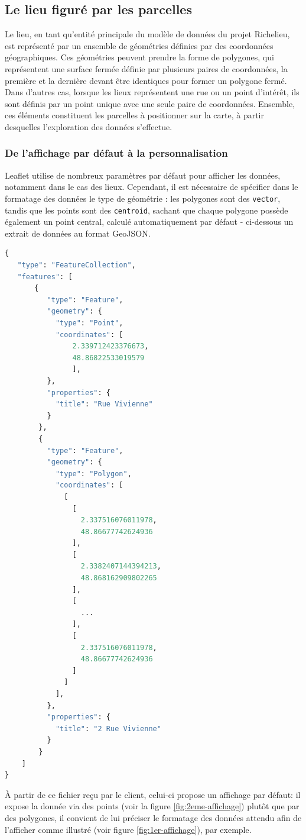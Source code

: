 \subsection{Le lieu figuré par les parcelles}
Le lieu, en tant qu'entité principale du modèle de données du projet Richelieu, est représenté par un ensemble de géométries définies par des coordonnées géographiques. Ces géométries peuvent prendre la forme de polygones, qui représentent une surface fermée définie par plusieurs paires de coordonnées, la première et la dernière devant être identiques pour former un polygone fermé. Dans d'autres cas, lorsque les lieux représentent une rue ou un point d'intérêt, ils sont définis par un point unique avec une seule paire de coordonnées. Ensemble, ces éléments constituent les parcelles à positionner sur la carte, à partir desquelles l'exploration des données s'effectue.

\subsubsection{De l'affichage par défaut à la personnalisation}
Leaflet utilise de nombreux paramètres par défaut pour afficher les données, notamment dans le cas des lieux. Cependant, il est nécessaire de spécifier dans le formatage des données le type de géométrie : les polygones sont des \texttt{vector}, tandis que les points sont des \texttt{centroid}, sachant que chaque polygone possède également un point central, calculé automatiquement par défaut - ci-dessous un extrait de données au format GeoJSON.  

\begin{lstlisting}[language=PYTHON, caption=Structure GeoJSON]
{
   "type": "FeatureCollection",
   "features": [
       {
          "type": "Feature",
          "geometry": {
            "type": "Point",
            "coordinates": [  
                2.339712423376673,
                48.86822533019579
                ],
          },
          "properties": {
            "title": "Rue Vivienne"
          }
        },
        {
          "type": "Feature",
          "geometry": {
            "type": "Polygon",
            "coordinates": [
              [
                [
                  2.337516076011978,
                  48.86677742624936
                ],
                [
                  2.3382407144394213,
                  48.868162909802265
                ],
                [
                  ...
                ],
                [
                  2.337516076011978,
                  48.86677742624936
                ]
              ]
            ],
          },
          "properties": {
            "title": "2 Rue Vivienne"
          }
        }
    ]
}
\end{lstlisting}
À partir de ce fichier reçu par le client, celui-ci propose un affichage par défaut: il expose la donnée via des points (voir la figure \ref{fig:2eme-affichage}) plutôt que par des polygones, il convient de lui préciser le formatage des données attendu afin de l'afficher comme illustré (voir figure \ref{fig:1er-affichage}), par exemple. 

